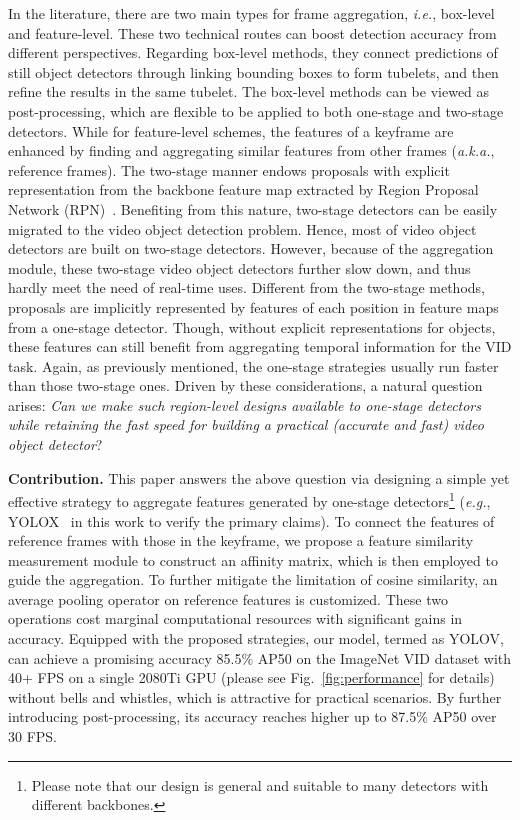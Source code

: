 \documentclass[letterpaper]{article} \usepackage{aaai23}  \usepackage{times}  \usepackage{helvet}  \usepackage{courier}  \usepackage[hyphens]{url}  \usepackage{graphicx} \urlstyle{rm} \def\UrlFont{\rm}  \usepackage{natbib}  \usepackage{caption} \usepackage{xcolor}
\begin{document}
In the literature, there are two main types for frame aggregation, \emph{i.e.}, box-level and feature-level. These two technical routes can boost detection accuracy from different perspectives. Regarding box-level methods, they connect predictions of still object detectors through linking bounding boxes to form tubelets, and then refine the results in the same tubelet. 
The box-level methods can be viewed as post-processing, which are flexible to be applied to both one-stage and two-stage detectors. While for feature-level schemes, the features of a keyframe are enhanced by finding and aggregating similar features from other frames (\emph{a.k.a.}, reference frames). The two-stage manner endows proposals with explicit representation from the backbone feature map extracted by Region Proposal Network (RPN)~\cite{ren2015faster}. Benefiting from this nature, two-stage detectors can be easily migrated to the video object detection problem. Hence, most of video object detectors are built on two-stage detectors. However, because of the aggregation module, these two-stage video object detectors further slow down, and thus hardly meet the need of real-time uses. 
Different from the two-stage methods, proposals are implicitly represented by features of each position in feature maps from a one-stage detector. Though, without explicit representations for objects, these features can still benefit from aggregating temporal information for the VID task. Again, as previously mentioned, the one-stage strategies usually run faster than those two-stage ones. Driven by these considerations, a natural question arises: \emph{Can we make such region-level designs available to one-stage detectors while retaining the fast speed for building a practical (accurate and fast) video object detector}? 

\noindent
\textbf{Contribution.} This paper answers the above question via designing a simple yet effective strategy to aggregate features generated by one-stage detectors\footnote{Please note that our design is general and suitable to many detectors with different backbones.} (\emph{e.g.}, YOLOX~\cite{ge2021yolox} in this work to verify the primary claims). To connect the features of reference frames with those in the keyframe, we propose a feature similarity measurement module to construct an affinity matrix, which is then employed to guide the aggregation. To further mitigate the limitation of cosine similarity, an average pooling operator on reference features is customized. These two operations cost marginal computational resources with significant gains in accuracy. Equipped with the proposed strategies, our model, termed as YOLOV, can achieve a promising accuracy 85.5$\%$ AP50 on the ImageNet VID dataset with 40+ FPS on a single 2080Ti GPU (please see Fig.~\ref{fig:performance} for details) without bells and whistles, which is attractive for practical scenarios. By further introducing post-processing, its accuracy reaches higher up to 87.5$\%$ AP50 over 30 FPS.
\end{document}

